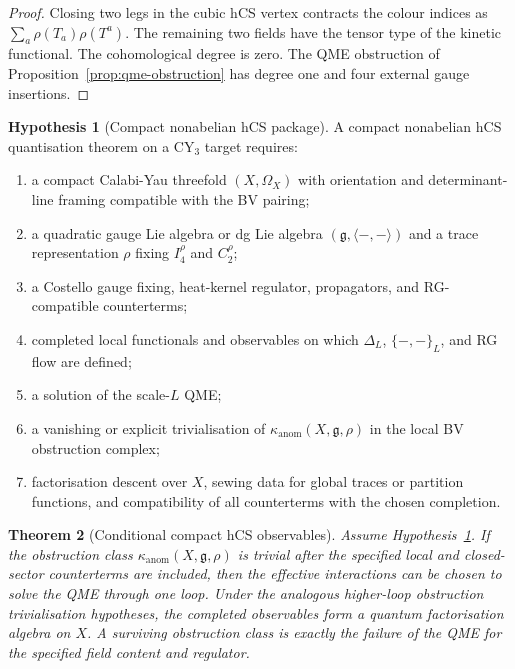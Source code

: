 \documentclass[11pt]{amsart}
\theoremstyle{plain}
\newtheorem{theorem}{Theorem}[section]
\theoremstyle{definition}
\newtheorem{hypothesis}[theorem]{Hypothesis}
\theoremstyle{remark}
\providecommand{\fg}{\mathfrak{g}}
\providecommand{\kanom}{\kappa_{\mathrm{anom}}}
\begin{document}
\begin{proof}
Closing two legs in the cubic hCS vertex contracts the colour indices
as \(\sum_a\rho(T_a)\rho(T^a)\). The remaining two fields have the
tensor type of the kinetic functional. The cohomological degree is zero.
The QME obstruction of Proposition~\ref{prop:qme-obstruction} has
degree one and four external gauge insertions.
\end{proof}

\begin{hypothesis}[Compact nonabelian hCS package]
\label{hyp:compact-hcs-package}
A compact nonabelian hCS quantisation theorem on a CY$_3$ target
requires:
\begin{enumerate}[label=\textup{(\roman*)}]
\item a compact Calabi-Yau threefold \((X,\Omega_X)\) with orientation
and determinant-line framing compatible with the BV pairing;
\item a quadratic gauge Lie algebra or dg Lie algebra
\((\fg,\langle-,-\rangle)\) and a trace representation \(\rho\) fixing
\(I_4^\rho\) and \(C_2^\rho\);
\item a Costello gauge fixing, heat-kernel regulator, propagators, and
RG-compatible counterterms;
\item completed local functionals and observables on which
\(\Delta_L\), \(\{-,-\}_L\), and RG flow are defined;
\item a solution of the scale-\(L\) QME;
\item a vanishing or explicit trivialisation of
\(\kanom(X,\fg,\rho)\) in the local BV obstruction complex;
\item factorisation descent over \(X\), sewing data for global traces
or partition functions, and compatibility of all counterterms with the
chosen completion.
\end{enumerate}
\end{hypothesis}

\begin{theorem}[Conditional compact hCS observables]
\label{thm:conditional-compact-hcs}
Assume Hypothesis~\ref{hyp:compact-hcs-package}. If the obstruction
class \(\kanom(X,\fg,\rho)\) is trivial after the specified local and
closed-sector counterterms are included, then the effective
interactions can be chosen to solve the QME through one loop. Under the
analogous higher-loop obstruction trivialisation hypotheses, the
completed observables form a quantum factorisation algebra on \(X\).
A surviving obstruction class is exactly the failure of the QME for the
specified field content and regulator.
\end{theorem}
\end{document}
